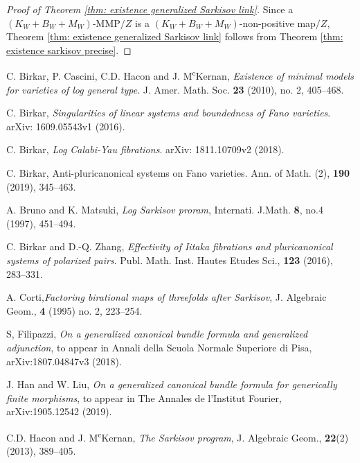 \documentclass[11pt]{amsart}
\numberwithin{equation}{section}
\theoremstyle{definition}
\theoremstyle{remark}
\theoremstyle{definition}
\begin{document}
\begin{proof}[Proof of Theorem \ref{thm: existence generalized Sarkisov link}]
Since a $(K_W+B_W+M_W)$-MMP$/Z$ is a $(K_W+B_W+M_W)$-non-positive map$/Z$, Theorem \ref{thm: existence generalized Sarkisov link} follows from Theorem \ref{thm: existence sarkisov precise}.
\end{proof}










\begin{thebibliography}{99}

	C. Birkar, P. Cascini, C.D. Hacon and J. M\textsuperscript{c}Kernan,  \textit{Existence of minimal models for varieties of log general type}. J. Amer. Math. Soc. {\bf 23} (2010), no. 2, 405--468.		


		 C. Birkar, \textit{Singularities of linear systems and boundedness of Fano varieties}. arXiv: 1609.05543v1 (2016).

 C. Birkar, \textit{Log Calabi-Yau fibrations}. arXiv: 1811.10709v2 (2018).

	 C. Birkar, {Anti-pluricanonical systems on Fano varieties}. Ann. of Math. (2), \textbf{190} (2019), 345--463.

 A. Bruno and K. Matsuki, \textit{Log Sarkisov proram}, Internati. J.Math. \textbf{8}, no.4 (1997), 451--494.

 C. Birkar and D.-Q. Zhang, \textit{Effectivity of Iitaka fibrations and pluricanonical systems of polarized pairs}. Publ. Math. Inst. Hautes Etudes Sci., \textbf{123} (2016), 283--331.

 A. Corti,\textit{Factoring  birational  maps  of  threefolds  after  Sarkisov}, J. Algebraic Geom., \textbf{4} (1995) no. 2, 223--254.

 S, Filipazzi, \textit{On a generalized canonical bundle formula and generalized adjunction}, to appear in Annali della Scuola Normale Superiore di Pisa, arXiv:1807.04847v3 (2018).

J. Han and W. Liu, \emph{On a generalized canonical bundle formula for generically finite morphisms}, to appear in The Annales de l’Institut Fourier, arXiv:1905.12542 (2019).

 C.D. Hacon and J. M\textsuperscript{c}Kernan, \textit{The Sarkisov program}, J. Algebraic Geom., \textbf{22}(2) (2013), 389--405.




\end{thebibliography}
\end{document}
